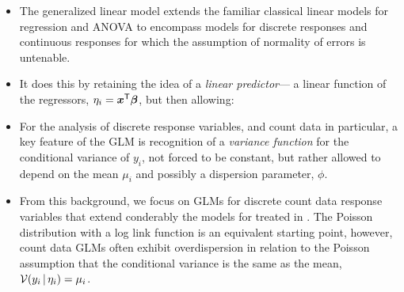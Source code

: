 \begin{itemize}

  \item The generalized linear model extends the familiar classical linear models for regression and ANOVA to encompass
  models for discrete responses and continuous responses for which the assumption of normality of errors is untenable.
  
  \item It does this by retaining the idea of a \emph{linear predictor}---
  a linear function of the regressors, 
  $\eta_i = \bm{x}^\mathsf{T} \bm{\beta}$, but then allowing:
  
  \item For the analysis of discrete response variables, and count data in particular, a key feature
  of the GLM is recognition of a \emph{variance function} for the conditional variance of 
  $y_i$, not forced to be constant, but rather allowed to depend on the mean $\mu_i$ and 
  possibly a dispersion parameter, $\phi$.
  
  \item From this background, we focus on GLMs for discrete count data response variables that extend conderably
  the \loglin models for \ctabs
  treated in .  The Poisson distribution with a log
  link function is an equivalent starting point, however, count data
  GLMs often exhibit overdispersion in relation to the Poisson assumption that the conditional variance
  is the same as the mean, $\mathcal{V}(y_i \, | \, \eta_i) = \mu_i$.
  

\end{itemize}
